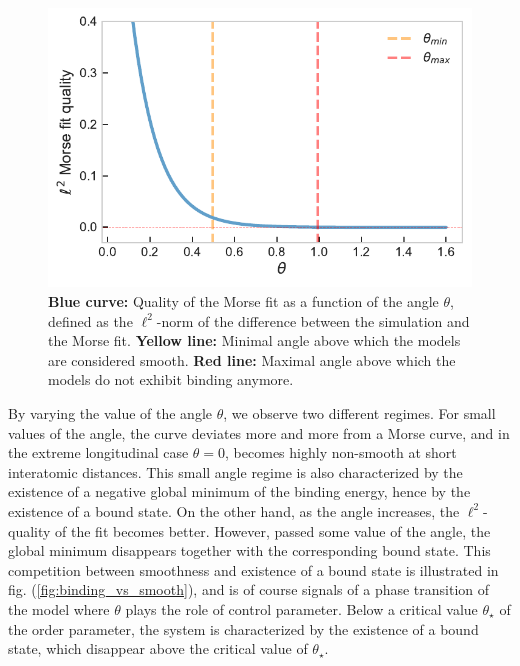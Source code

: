 \documentclass[reprint, amsmath, amssymb, floatfix, aps, pra]{revtex4-2}
\begin{document}
    \begin{figure}
        \includegraphics[scale=0.75]{figures/morse_quality.pdf}
        \caption{\label{fig:morse_quality}\textbf{Blue curve:} Quality of the Morse fit as a function of the angle $\theta$, defined as the $\ell^2$-norm of the difference between the simulation and the Morse fit. \textbf{Yellow line:} Minimal angle above which the models are considered smooth. \textbf{Red line:} Maximal angle above which the models do not exhibit binding anymore.}
    \end{figure}

    By varying the value of the angle $\theta$, we observe two different regimes. For small values of the angle, the curve deviates more and more from a Morse curve, and in the extreme longitudinal case $\theta=0$, becomes highly non-smooth at short interatomic distances. This small angle regime is also characterized by the existence of a negative global minimum of the binding energy, hence by the existence of a bound state. On the other hand, as the angle increases, the $\ell^2$-quality of the fit becomes better. However, passed some value of the angle, the global minimum disappears together with the corresponding bound state. This competition between smoothness and existence of a bound state is illustrated in fig. (\ref{fig:binding_vs_smooth}), and is of course signals of a phase transition of the model where $\theta$ plays the role of control parameter. Below a critical value $\theta_\star$ of the order parameter, the system is characterized by the existence of a bound state, which disappear above the critical value of $\theta_\star$.
\end{document}
